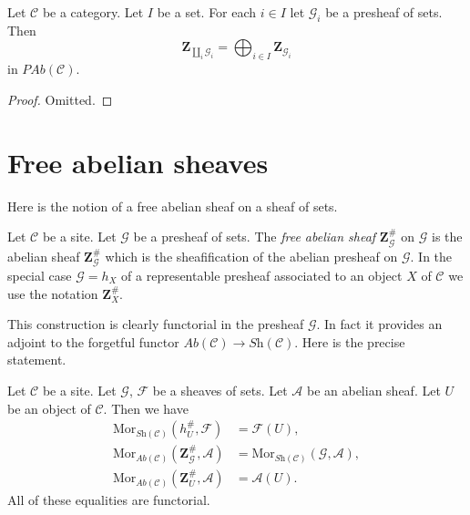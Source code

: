 \begin{lemma}
\label{lemma-coproduct-sum-free-abelian-presheaf}
Let $\mathcal{C}$ be a category.
Let $I$ be a set. For each $i \in I$ let
$\mathcal{G}_i$ be a presheaf of sets.
Then
$$
\mathbf{Z}_{\coprod_i \mathcal{G}_i}
=
\bigoplus\nolimits_{i \in I} \mathbf{Z}_{\mathcal{G}_i}
$$
in $\textit{PAb}(\mathcal{C})$.
\end{lemma}

\begin{proof}
Omitted.
\end{proof}



\section{Free abelian sheaves}
\label{section-free-abelian-sheaf}

\noindent
Here is the notion of a free abelian sheaf on a sheaf of sets.

\begin{definition}
\label{definition-free-abelian-sheaf-on}
Let $\mathcal{C}$ be a site. Let $\mathcal{G}$ be a presheaf of sets.
The {\it free abelian sheaf} $\mathbf{Z}_{\mathcal{G}}^\#$
on $\mathcal{G}$ is the abelian sheaf $\mathbf{Z}_{\mathcal{G}}^\#$
which is the sheafification of the abelian presheaf on $\mathcal{G}$.
In the special case $\mathcal{G} = h_X$ of a representable presheaf
associated to an object $X$ of $\mathcal{C}$
we use the notation $\mathbf{Z}_X^\#$.
\end{definition}

\noindent
This construction is clearly functorial in the presheaf $\mathcal{G}$.
In fact it provides an adjoint to the forgetful functor
$\textit{Ab}(\mathcal{C}) \to \textit{Sh}(\mathcal{C})$.
Here is the precise statement.

\begin{lemma}
\label{lemma-obvious-adjointness-sheaves}
Let $\mathcal{C}$ be a site.
Let $\mathcal{G}$, $\mathcal{F}$ be a sheaves of sets.
Let $\mathcal{A}$ be an abelian sheaf.
Let $U$ be an object of $\mathcal{C}$. Then
we have
\begin{align*}
\text{Mor}_{\textit{Sh}(\mathcal{C})}(h_U^\#, \mathcal{F})
& =
\mathcal{F}(U), \\
\text{Mor}_{\textit{Ab}(\mathcal{C})}(\mathbf{Z}_{\mathcal{G}}^\#,
\mathcal{A})
& =
\text{Mor}_{\textit{Sh}(\mathcal{C})}(\mathcal{G}, \mathcal{A}), \\
\text{Mor}_{\textit{Ab}(\mathcal{C})}(\mathbf{Z}_U^\#, \mathcal{A})
& =
\mathcal{A}(U).
\end{align*}
All of these equalities are functorial.
\end{lemma}

